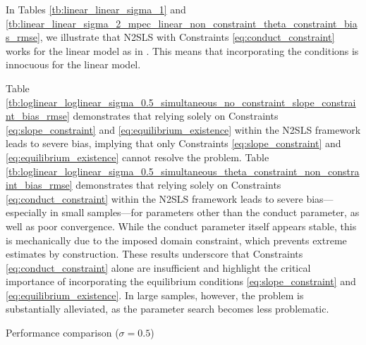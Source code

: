 \documentclass[11pt, a4paper]{article}
\theoremstyle{remark}
\begin{document}
In Tables \ref{tb:linear_linear_sigma_1} and  \ref{tb:linear_linear_sigma_2_mpec_linear_non_constraint_theta_constraint_bias_rmse}, we illustrate that N2SLS with Constraints \eqref{eq:conduct_constraint} works for the linear model as in \cite{matsumura2023resolving}. 
This means that incorporating the conditions is innocuous for the linear model. 

Table \ref{tb:loglinear_loglinear_sigma_0.5_simultaneous_no_constraint_slope_constraint_bias_rmse} demonstrates that relying solely on Constraints \eqref{eq:slope_constraint} and \eqref{eq:equilibrium_existence} within the N2SLS framework leads to severe bias, implying that only Constraints \eqref{eq:slope_constraint} and \eqref{eq:equilibrium_existence} cannot resolve the problem. Table \ref{tb:loglinear_loglinear_sigma_0.5_simultaneous_theta_constraint_non_constraint_bias_rmse} demonstrates that relying solely on Constraints \eqref{eq:conduct_constraint} within the N2SLS framework leads to severe bias—especially in small samples—for parameters other than the conduct parameter, as well as poor convergence. While the conduct parameter itself appears stable, this is mechanically due to the imposed domain constraint, which prevents extreme estimates by construction. These results underscore that Constraints \eqref{eq:conduct_constraint} alone are insufficient and highlight the critical importance of incorporating the equilibrium conditions \eqref{eq:slope_constraint} and \eqref{eq:equilibrium_existence}. In large samples, however, the problem is substantially alleviated, as the parameter search becomes less problematic. 






\begin{table}[!htbp]
  \centering
  \caption{Performance comparison ($\sigma=0.5$)}
  \label{tb:loglinear_loglinear_sigma_0.5_simultaneous_theta_constraint_slope_constraint_bias_rmse}
  \\[0.5em]
  \begin{adjustbox}{width=0.95\textwidth}
    
  \end{adjustbox}
  \vspace{1.5em}  %
  \\[0.5em]
  \begin{adjustbox}{width=0.95\textwidth}
   
  \end{adjustbox}
  \footnotesize
\end{table}
\end{document}
